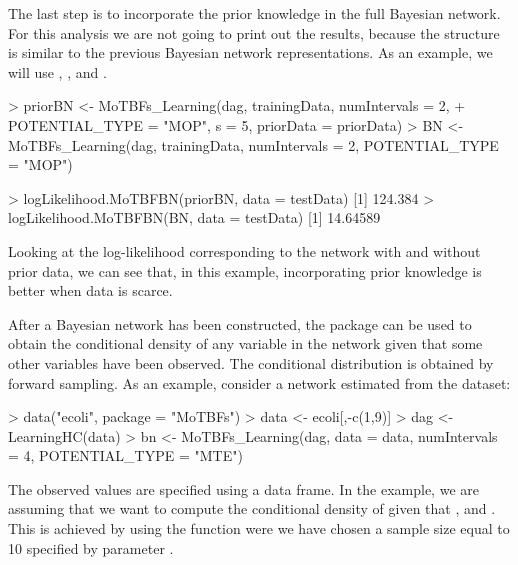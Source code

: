 The last step is to incorporate the prior knowledge in the full Bayesian network. For this analysis we are not going to print 
out the results, because the structure is similar to the previous Bayesian network representations. As an example, we will use 
, , and .

\begin{example}
> priorBN <- MoTBFs_Learning(dag, trainingData, numIntervals = 2, 
+             POTENTIAL_TYPE = "MOP", s = 5, priorData = priorData)
> BN <- MoTBFs_Learning(dag, trainingData, numIntervals = 2, POTENTIAL_TYPE = "MOP")

> logLikelihood.MoTBFBN(priorBN, data = testData)
[1] 124.384
> logLikelihood.MoTBFBN(BN, data = testData) 
[1] 14.64589
\end{example}

Looking at the log-likelihood corresponding to the network with and without prior data, we can see that,
in this example, incorporating prior knowledge is better when data is scarce.

After a Bayesian network has been constructed, the  package can be used to obtain the conditional 
density of any variable  in the network given that some other variables have been observed. The conditional 
distribution is obtained by forward sampling. As an example, consider a network estimated from the  dataset:

\begin{example}
> data("ecoli", package = "MoTBFs")
> data <- ecoli[,-c(1,9)]
> dag <- LearningHC(data)
> bn <- MoTBFs_Learning(dag, data = data, numIntervals = 4, POTENTIAL_TYPE = "MTE")
\end{example}
The observed values are specified using a data frame. In the example, we are assuming that we want to compute
the conditional density of  given that ,  and .
This is achieved by using the function  were we have chosen a sample size equal to 10 specified
by parameter .

